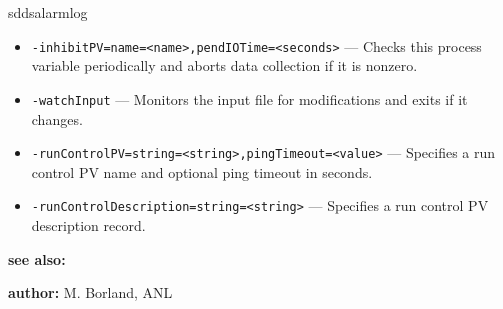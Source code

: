 \begin{sddsprog}{sddsalarmlog}
\begin{itemize}
      \item {\tt -inhibitPV=name=<name>,pendIOTime=<seconds>} --- Checks this process variable periodically and aborts data collection if it is nonzero.
      \item {\tt -watchInput} --- Monitors the input file for modifications and exits if it changes.
      \item {\tt -runControlPV=string=<string>,pingTimeout=<value>} --- Specifies a run control PV name and optional ping timeout in seconds.
      \item {\tt -runControlDescription=string=<string>} --- Specifies a run control PV description record.
    \end{itemize}

\item \textbf{see also:}


\item \textbf{author:} M. Borland, ANL 
\end{sddsprog}
